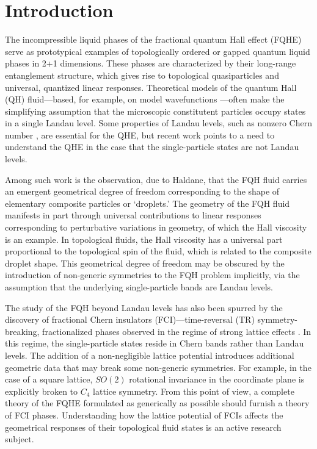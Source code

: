 \documentclass[aps,prb,twocolumn,letterpaper,twoside,nobalancelastpage,groupedaddress,amsmath,amssymb,floatfix,citeautoscript]{revtex4-1}
\begin{document}

\maketitle

\section{Introduction}
The incompressible liquid phases of the fractional quantum Hall effect (FQHE) serve as prototypical examples of topologically ordered or gapped quantum liquid phases\cite{yoshioka_quantum_2002,fradkin_field_2013} in 2+1 dimensions. These phases are characterized by their long-range entanglement structure, which gives rise to topological quasiparticles and universal, quantized linear responses. Theoretical models of the quantum Hall (QH) fluid---based, for example, on model wavefunctions \cite{laughlin_anomalous_1983}---often make the simplifying assumption that the microscopic constitutent particles occupy states in a single Landau level. Some properties of Landau levels, such as nonzero Chern number \cite{thouless_quantized_1982}, are essential for the QHE, but recent work points to a need to understand the QHE in the case that the single-particle states are not Landau levels.

Among such work is the observation, due to Haldane, that the FQH fluid carries an emergent geometrical degree of freedom\cite{haldane_geometrical_2011} corresponding to the shape of elementary composite particles or `droplets.' \cite{johri_probing_2016} The geometry of the FQH fluid manifests in part through universal contributions to linear responses corresponding to perturbative variations in geometry, of which the Hall viscosity\cite{avron_viscosity_1995,tokatly_lorentz_2007,read_non-abelian_2009,haldane_hall_2009} is an example. In topological fluids, the Hall viscosity has a universal part proportional to the topological spin of the fluid\cite{read_non-abelian_2009}, which is related to the composite droplet shape.\cite{johri_probing_2016} This geometrical degree of freedom may be obscured by the introduction of non-generic symmetries to the FQH problem implicitly, via the assumption that the underlying single-particle bands are Landau levels.

The study of the FQH beyond Landau levels has also been spurred by the discovery of fractional Chern insulators (FCI)---time-reversal (TR) symmetry-breaking, fractionalized phases observed in the regime of strong lattice effects \cite{Bergholtz:2013ue,parameswaran_fractional_2013}. In this regime, the single-particle states reside in Chern bands rather than Landau levels. The addition of a non-negligible lattice potential introduces additional geometric data that may break some non-generic symmetries. For example, in the case of a square lattice, $SO(2)$ rotational invariance in the coordinate plane is explicitly broken to $C_4$ lattice symmetry. From this point of view, a complete theory of the FQHE formulated as generically as possible should furnish a theory of FCI phases. Understanding how the lattice potential of FCIs affects the geometrical responses of their topological fluid states is an active research subject. \cite{shapourian_viscoelastic_2015}
\end{document}
